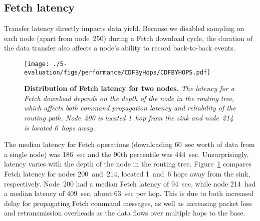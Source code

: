\subsection{Fetch latency}

Transfer latency directly impacts data yield. Because we disabled sampling on
each node (apart from node~250) during a Fetch download cycle, 
the duration of the data transfer also affects a node's ability to 
record back-to-back events.  

\begin{figure}[t]
\begin{center}
\texttt{[image: ./5-evaluation/figs/performance/CDFByHops/CDFBYHOPS.pdf]}
\end{center}
\caption{\small{\bf Distribution of Fetch latency for two nodes.} {\em The
latency for a Fetch download depends on the depth of the node in the
routing tree, which affects both command propagation latency and
reliability of the routing path. Node~200 is located 1~hop from the 
sink and node~214 is located 6~hops away.}}
\label{fig-fetchlatency-byhops}
\end{figure}

The median latency for Fetch operations (downloading 60~sec worth of
data from a single node) was 186~sec and the 90th
percentile was 444~sec. Unsurprisingly, latency varies with the depth of
the node in the routing tree.  Figure~\ref{fig-fetchlatency-byhops}
compares Fetch latency for nodes 200~and~214, located 1~and~6 hops
away from the sink, respectively. Node~200 had a median Fetch latency
of 94~sec, while node 214~had a median latency of 409~sec,
about 63~sec per hop.  This is due to both increased delay for propagating
Fetch command messages, as well as increasing packet loss and
retransmission overheads as the data flows over multiple hops to the
base.




